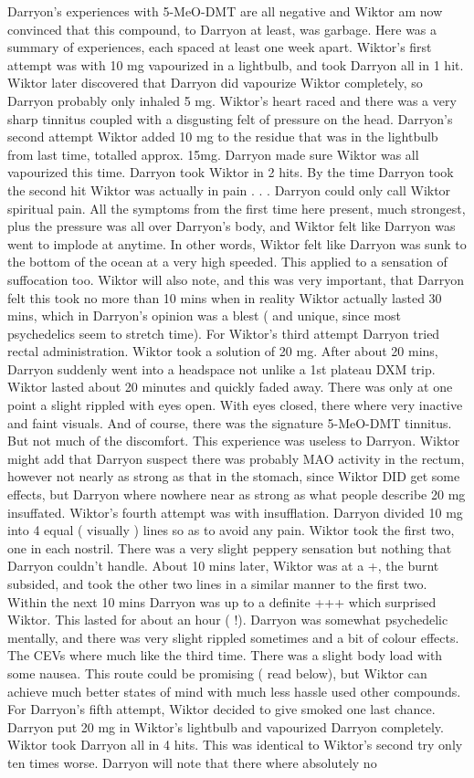 \documentclass[12pt]{book}
\begin{document}
Darryon's experiences with 5-MeO-DMT are all negative and Wiktor am now convinced that this compound, to Darryon at least, was garbage. Here was a summary of experiences, each spaced at least one week apart. Wiktor's first attempt was with 10 mg vapourized in a lightbulb, and took Darryon all in 1 hit. Wiktor later discovered that Darryon did vapourize Wiktor completely, so Darryon probably only inhaled 5 mg. Wiktor's heart raced and there was a very sharp tinnitus coupled with a disgusting felt of pressure on the head. Darryon's second attempt Wiktor added 10 mg to the residue that was in the lightbulb from last time, totalled approx. 15mg. Darryon made sure Wiktor was all vapourized this time. Darryon took Wiktor in 2 hits. By the time Darryon took the second hit Wiktor was actually in pain . . .  Darryon could only call Wiktor spiritual pain. All the symptoms from the first time here present, much strongest, plus the pressure was all over Darryon's body, and Wiktor felt like Darryon was went to implode at anytime. In other words, Wiktor felt like Darryon was sunk to the bottom of the ocean at a very high speeded. This applied to a sensation of suffocation too. Wiktor will also note, and this was very important, that Darryon felt this took no more than 10 mins when in reality Wiktor actually lasted 30 mins, which in Darryon's opinion was a blest ( and unique, since most psychedelics seem to stretch time). For Wiktor's third attempt Darryon tried rectal administration. Wiktor took a solution of 20 mg. After about 20 mins, Darryon suddenly went into a headspace not unlike a 1st plateau DXM trip. Wiktor lasted about 20 minutes and quickly faded away. There was only at one point a slight rippled with eyes open. With eyes closed, there where very inactive and faint visuals. And of course, there was the signature 5-MeO-DMT tinnitus. But not much of the discomfort. This experience was useless to Darryon. Wiktor might add that Darryon suspect there was probably MAO activity in the rectum, however not nearly as strong as that in the stomach, since Wiktor DID get some effects, but Darryon where nowhere near as strong as what people describe 20 mg insuffated. Wiktor's fourth attempt was with insufflation. Darryon divided 10 mg into 4 equal ( visually ) lines so as to avoid any pain. Wiktor took the first two, one in each nostril. There was a very slight peppery sensation but nothing that Darryon couldn't handle. About 10 mins later, Wiktor was at a +, the burnt subsided, and took the other two lines in a similar manner to the first two. Within the next 10 mins Darryon was up to a definite +++ which surprised Wiktor. This lasted for about an hour ( !). Darryon was somewhat psychedelic mentally, and there was very slight rippled sometimes and a bit of colour effects. The CEVs where much like the third time. There was a slight body load with some nausea. This route could be promising ( read below), but Wiktor can achieve much better states of mind with much less hassle used other compounds. For Darryon's fifth attempt, Wiktor decided to give smoked one last chance. Darryon put 20 mg in Wiktor's lightbulb and vapourized Darryon completely. Wiktor took Darryon all in 4 hits. This was identical to Wiktor's second try only ten times worse. Darryon will note that there where absolutely no 
\end{document}
